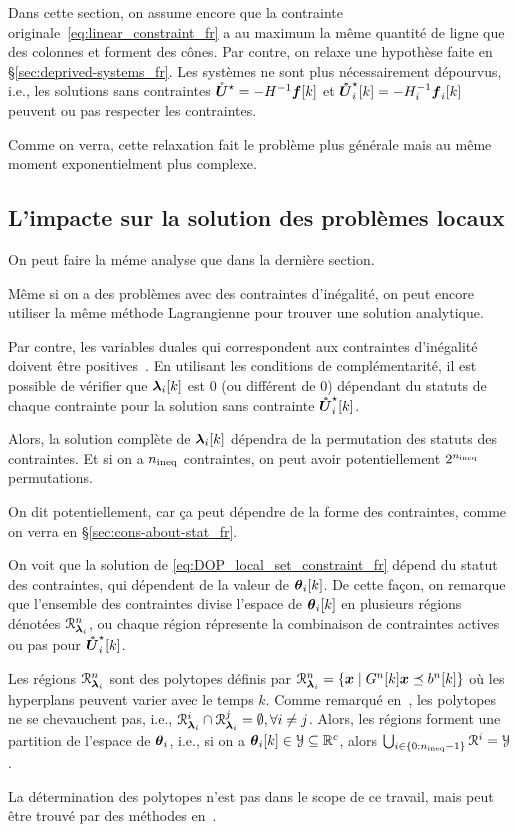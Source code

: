 \documentclass[../main.tex]{subfiles}
\begin{document}
Dans cette section, on assume encore que la contrainte originale~\eqref{eq:linear_constraint_fr} a au maximum la même quantité de ligne que des colonnes et forment des cônes.
Par contre, on relaxe une hypothèse faite en \S\ref{sec:deprived-systems_fr}.
Les systèmes ne sont plus nécessairement dépourvus, i.e., les solutions sans contraintes
${\mathring{\boldsymbol{U}}^{\star}}=-H^{-1}\boldsymbol{f}[k]$ et $\optuncUik=-H_{i}^{-1}\vec{f}_{i}[k]$ peuvent ou pas respecter les contraintes.

Comme on verra, cette relaxation fait le problème plus générale mais au même moment exponentielment plus complexe.

\subsection{L'impacte sur la solution des problèmes locaux}\label{sec:impact-local-problem_fr}
On peut faire la méme analyse que dans la dernière section.

Même si on a des problèmes \qp{} avec des contraintes d'inégalité, on peut encore utiliser la même méthode Lagrangienne pour trouver une solution analytique.

Par contre, les variables duales qui correspondent aux contraintes d'inégalité doivent être positives~\cite{BoydVandenberghe2004}.
En utilisant les conditions de complémentarité, il est possible de vérifier que $\lambdaik$ est $0$ (ou différent de $0$) dépendant du statuts de chaque contrainte pour la solution sans contrainte $\optuncUik$.

Alors, la solution complète de $\lambdaik$ dépendra de la permutation des statuts des contraintes.
Et si on a $n_{\text{ineq}}$ contraintes, on peut avoir potentiellement $2^{n_{\text{ineq}}}$ permutations.
\begin{remark}
  On dit potentiellement, car ça peut dépendre de la forme des contraintes, comme on verra en \S\ref{sec:cons-about-stat_fr}.
\end{remark}

On voit que la solution de \eqref{eq:DOP_local_set_constraint_fr} dépend du statut des contraintes, qui dépendent de la valeur de $\thetaik$.
De cette façon, on remarque que l'ensemble des contraintes divise l'espace de $\thetaik$ en plusieurs régions dénotées $\mathcal{R}_{\boldsymbol{\lambda}_{i}}^{n}$, ou chaque région répresente la combinaison de contraintes actives ou pas pour $\optuncUik$.

Les régions $\mathcal{R}_{\boldsymbol{\lambda}_{i}}^{n}$ sont des polytopes définis par ${\mathcal{R}_{\boldsymbol{\lambda}_{i}}^{n}=\{\boldsymbol{x}\mid G^{n}[k]\boldsymbol{x} \preceq b^{n}[k]\}}$ où les hyperplans peuvent varier avec le temps $k$.
Comme remarqué en~\cite{BemporadEtAl2002}, les polytopes ne se chevauchent pas, i.e., ${\mathcal{R}_{\boldsymbol{\lambda}_{i}}^{i}\cap\mathcal{R}_{\boldsymbol{\lambda}_{i}}^{j}=\emptyset, \forall i\neq j}$.
Alors, les régions forment une partition de l'espace de $\boldsymbol{\theta}_{i}$, i.e., si on a $\thetaik\in\set{Y}\subseteq\R^{c}$, alors ${\bigcup_{i\in\{0:n_{\text{ineq}}-1\}}\mathcal{R}^{i}=\mathcal{Y}}$.
\begin{remark}
  La détermination des polytopes n'est pas dans le scope de ce travail, mais peut être trouvé par des méthodes en~\cite[\S4.1.3.2]{LauerBloch2019}.
\end{remark}
\end{document}
